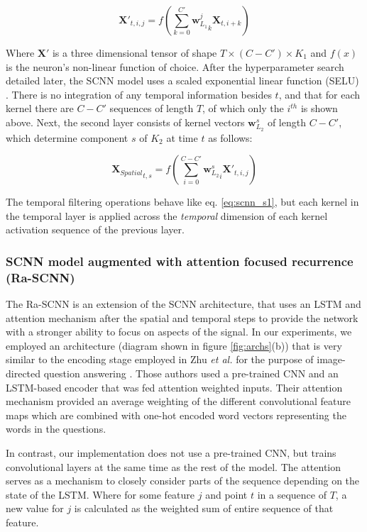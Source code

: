 \documentclass[fleqn,10pt]{wlscirep}
\begin{document}
\begin{equation} \label{eq:scnn_s1}
  \boldsymbol{X'}_{t, i, j} = f\left(\sum_{k=0}^{C'} {\boldsymbol{w}_{L_1}^j}_k \boldsymbol{X}_{t,i+k}\right)
\end{equation}

Where $\boldsymbol{X'}$ is a three dimensional tensor of shape $T \times (C-C') \times K_1$ and $f(x)$ is the neuron's non-linear function of choice. After the hyperparameter search detailed later, the SCNN model uses a scaled exponential linear function (SELU) \cite{NIPS2017_6698}. There is no integration of any temporal information besides $t$, and that for each kernel there are $C-C'$ sequences of length $T$, of which only the $i^{th}$ is shown above. Next, the second layer consists of kernel vectors $\boldsymbol{w}_{L_2}^s$ of length $C-C'$, which determine component $s$ of $K_2$ at time $t$ as follows:

\begin{equation} \label{eq:scnn_s2}
  {\boldsymbol{X}_{Spatial}}_{t, s} = f\left(\sum_{i=0}^{C-C'}{\boldsymbol{w}_{L_2}^s}_i \boldsymbol{X'}_{t, i, j}\right)
\end{equation}

The temporal filtering operations behave like eq. \ref{eq:scnn_s1}, but each kernel in the temporal layer is applied across the {\em temporal} dimension of each kernel activation sequence of the previous layer.

\subsubsection*{SCNN model augmented with attention focused recurrence (Ra-SCNN)} 

The Ra-SCNN is an extension of the SCNN architecture, that uses an LSTM and attention mechanism after the spatial and temporal steps to provide the network with a stronger ability to focus on aspects of the signal. In our experiments, we employed an architecture (diagram shown in figure \ref{fig:archs}(b)) that is very similar to the encoding stage employed in Zhu {\em et al.} for the purpose of image-directed question answering \cite{Zhu}. Those authors used a pre-trained CNN and an LSTM-based encoder that was fed attention weighted inputs. Their attention mechanism provided an average weighting of the different convolutional feature maps which are combined with one-hot encoded word vectors representing the words in the questions.

In contrast, our implementation does not use a pre-trained CNN, but trains convolutional layers at the same time as the rest of the model. The attention serves as a mechanism to closely consider parts of the sequence depending on the state of the LSTM. Where for some feature $j$ and point $t$ in a sequence of $T$, a new value for $j$ is calculated as the weighted sum of entire sequence of that feature.  
\end{document}
